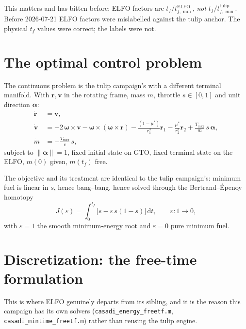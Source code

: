 \documentclass[11pt]{article}
\newcommand{\ud}{\,\mathrm{d}}
\newcommand{\vect}[1]{\bm{#1}}
\newcommand{\file}[1]{\texttt{#1}}
\begin{document}
\noindent This matters and has bitten before: ELFO factors are
$t_f/t_{f,\min}^{\text{ELFO}}$, \emph{not} $t_f/t_{f,\min}^{\text{tulip}}$.
Before 2026-07-21 ELFO factors were mislabelled against the tulip anchor. The
physical $t_f$ values were correct; the labels were not.

\section{The optimal control problem}

The continuous problem is the tulip campaign's with a different terminal
manifold. With $\vect{r},\vect{v}$ in the rotating frame, mass $m$, throttle
$s\in[0,1]$ and unit direction $\vect{\alpha}$:
\begin{align}
\dot{\vect{r}} &= \vect{v}, \\
\dot{\vect{v}} &= -2\,\vect{\omega}\times\vect{v}
   - \vect{\omega}\times(\vect{\omega}\times\vect{r})
   -\frac{(1-\mu^\ast)}{r_1^3}\vect{r}_1
   -\frac{\mu^\ast}{r_2^3}\vect{r}_2
   +\frac{T_{\max}}{m}\,s\,\vect{\alpha}, \\
\dot{m} &= -\frac{T_{\max}}{c}\,s ,
\end{align}
subject to $\|\vect{\alpha}\|=1$, fixed initial state on GTO, fixed terminal
state on the ELFO, $m(0)$ given, $m(t_f)$ free.

The objective and its treatment are identical to the tulip campaign's: minimum
fuel is linear in $s$, hence bang--bang, hence solved through the
Bertrand--\'Epenoy homotopy
\begin{equation}
J(\varepsilon)=\int_0^{t_f}\big[s-\varepsilon\,s(1-s)\big]\ud t,
\qquad \varepsilon:1\to0 ,
\label{eq:hom}
\end{equation}
with $\varepsilon=1$ the smooth minimum-energy root and $\varepsilon=0$ pure
minimum fuel.

\section{Discretization: the free-time formulation}

This is where ELFO genuinely departs from its sibling, and it is the reason
this campaign has its own solvers (\file{casadi\_energy\_freetf.m},
\file{casadi\_mintime\_freetf.m}) rather than reusing the tulip engine.
\end{document}

